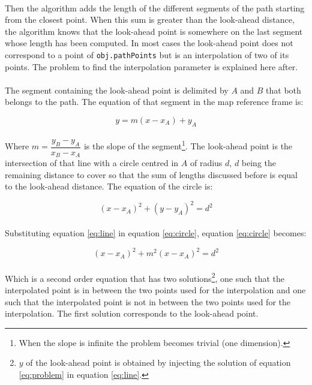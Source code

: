 \documentclass[12pt,a4paper]{article}
\begin{document}
\paragraph{} Then the algorithm adds the length of the different segments of the path starting from the closest point. When this sum is greater than the look-ahead distance, the algorithm knows that the look-ahead point is somewhere on the last segment whose length has been computed. In most cases the look-ahead point does not correspond to a point of \texttt{obj.pathPoints} but is an interpolation of two of its points. The problem to find the interpolation parameter is explained here after.

\paragraph{} The segment containing the look-ahead point is delimited by $A$ and $B$ that both belongs to the path. The equation of that segment in the map reference frame is:

\begin{equation}
  y = m (x-x_A) + y_A\label{eq:line}
\end{equation}

\paragraph{} Where $m=\dfrac{y_B-y_A}{x_B-x_A}$ is the slope of the segment\footnote{When the slope is infinite the problem becomes trivial (one dimension).}. The look-ahead point is the intersection of that line with a circle centred in $A$ of radius $d$, $d$ being the remaining distance to cover so that the sum of lengths discussed before is equal to the look-ahead distance. The equation of the circle is:

\begin{equation}
  (x-x_A)^2+(y-y_A)^2 = d^2 \label{eq:circle}
\end{equation}

\paragraph{} Substituting equation \ref{eq:line} in equation \ref{eq:circle}, equation \ref{eq:circle} becomes:

\begin{equation}
  (x-x_A)^2+m^2(x-x_A)^2 = d^2\label{eq:problem}
\end{equation}

\paragraph{} Which is a second order equation that has two solutions\footnote{$y$ of the look-ahead point is obtained by injecting the solution of equation \ref{eq:problem} in equation \ref{eq:line}.}, one such that the interpolated point is in between the two points used for the interpolation and one such that the interpolated point is not in between the two points used for the interpolation. The first solution corresponds to the look-ahead point.
\end{document}
